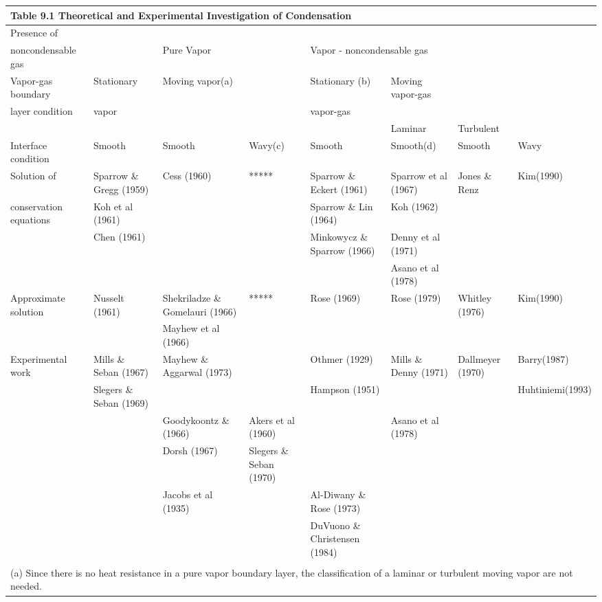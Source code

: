 \documentclass[12pt,fleqn]{report}
\begin{document}
{\begin{sidewaystable}
\begin{minipage}{9.0in}
\begin{center}
{\begin{tabular}{*{8}{l}}
\multicolumn{8}{l}{\bf Table 9.1  Theoretical and Experimental Investigation of Condensation} \\ [4mm] \hline
Presence of & & & & & & & \\ 
noncondensable gas & & Pure Vapor & & \multicolumn{2}{l}{Vapor - noncondensable gas} & & \\  [2mm] \hline
Vapor-gas boundary & Stationary & Moving vapor(a) & & Stationary (b) & Moving vapor-gas & & \\ 
layer condition & vapor & & & vapor-gas & &  & \\ 
& & & & & Laminar & Turbulent & \\  [2mm] \hline
Interface condition & Smooth & Smooth & Wavy(c) & Smooth & Smooth(d) & Smooth & Wavy\\  [2mm] \hline
Solution of & Sparrow \& Gregg (1959) & Cess (1960) & ***** & Sparrow \& Eckert (1961) & Sparrow et al (1967) & Jones \& Renz & Kim(1990)\\ 
conservation equations & Koh et al (1961) & & & Sparrow \& Lin (1964) & Koh (1962) & & \\ 
& Chen (1961) & & & Minkowycz \& Sparrow (1966) & Denny et al (1971) & & \\ 
& & & & & Asano et al (1978) & & \\  [2mm] \hline
Approximate solution & Nusselt (1961) &	Shekriladze \& Gomelauri     (1966) & *****	 & Rose (1969) & Rose (1979) & Whitley (1976) & Kim(1990)\\ 
& & Mayhew et al (1966) & & & & & \\  [2mm] \hline
Experimental work & Mills \& Seban (1967) & Mayhew \& Aggarwal (1973) & & Othmer (1929) & Mills \& Denny (1971) & Dallmeyer (1970) & Barry(1987)\\ 
& Slegers \& Seban (1969) & & & Hampson (1951) & & & Huhtiniemi(1993)\\ 
& & Goodykoontz \& (1966) & Akers et al (1960) & & Asano et al (1978) &	& \\ 
& & Dorsh (1967) & Slegers \& Seban (1970) & & & & \\ 
& & Jacobs et al (1935) & & Al-Diwany \& Rose (1973) & & & \\ 
& & & & DuVuono \& Christensen (1984) & & & \\  [2mm] \hline
& & & & & & & \\ 
\multicolumn{8}{l}{(a)  Since there is no heat resistance in a pure vapor boundary layer, the classification of a laminar or turbulent moving vapor are not needed.}\\ 

\end{tabular}}
\end{center}
\end{minipage}
\end{sidewaystable}}
\end{document}
